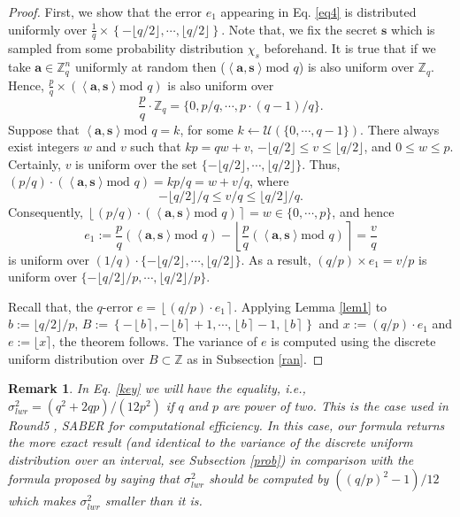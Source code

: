 \documentclass{cta-author}
\newtheorem{remark}{Remark}{}
\begin{document}
\begin{proof}
	First, we show that the error $e_1$ appearing in Eq. \eqref{eq4} is distributed uniformly over $\frac{1}{q} \times \left\{-\lfloor q/2 \rfloor, \cdots, \lfloor q/2 \rfloor \right\}$. 
	Note that, we fix the secret $\mathbf{s}$ which is sampled from some probability distribution $\chi_s$ beforehand. It is true that if we take $\mathbf{a} \in \mathbb{Z}_q^{n}$ uniformly at random then ($\left \langle\mathbf{a}, \mathbf{s} \right\rangle \text{mod }q$) is also uniform over $\mathbb{Z}_q$. Hence, $\frac{p}{q} \times (\left \langle\mathbf{a}, \mathbf{s} \right\rangle \text{mod }q)$ is also uniform over $$\frac{p}{q} \cdot \mathbb{Z}_q=\{0,p/q,\cdots, p \cdot (q-1)/q\}.$$ 
	Suppose that $\left \langle\mathbf{a}, \mathbf{s} \right\rangle \text{mod }q=k$, for some $k\leftarrow \mathcal{U}(\{0,\cdots,q-1\})$. There always exist integers $w$ and $v$ such that  $kp=qw+v$, $-\lfloor q/2 \rfloor \leq v \leq \lfloor q/2 \rfloor$, and $ 0 \leq w \leq p$. Certainly, $v$ is uniform over the set $\{-\lfloor q/2 \rfloor ,\cdots,\lfloor q/2 \rfloor \}$. Thus, $(p/q)\cdot (\left \langle\mathbf{a}, \mathbf{s} \right\rangle \text{mod }q)=kp/q=w+v/q$, where $$-\lfloor q/2 \rfloor/q \leq v/q \leq  \lfloor q/2 \rfloor/q.$$
	Consequently, $\left \lfloor (p/q) \cdot (\left \langle\mathbf{a}, \mathbf{s} \right\rangle \text{mod }q) \right\rceil =w \in \{0,\cdots,p\}$, and hence $$e_1:=\frac{p}{q}(\left \langle\mathbf{a}, \mathbf{s} \right\rangle \text{mod }q)-\left \lfloor \frac{p}{q}(\left \langle\mathbf{a}, \mathbf{s} \right\rangle \text{mod }q) \right\rceil =\frac{v}{q}$$ is uniform over $(1/q) \cdot \{-\lfloor q/2 \rfloor ,\cdots,\lfloor q/2 \rfloor \}$. As a result, $(q/p) \times e_1=v/p$ is uniform over $\{-{\lfloor q/2 \rfloor}/p, \cdots, {\lfloor q/2 \rfloor}/p\}.$ 
	
	Recall that, the $q$-error $e=\left \lfloor (q/p) \cdot e_1 \right \rceil.$ Applying Lemma \ref{lem1} to $b:={\lfloor q/2 \rfloor}/{p}$, $B:=\left\{-\left\lfloor b \right \rceil,  -\left\lfloor b \right \rceil+1, \cdots, \left\lfloor b \right \rceil -1, \left\lfloor b \right \rceil \right \}$ and $x:=(q/p) \cdot e_1$ and $e:=\lfloor x \rceil$, the theorem follows. The variance of $e$ is computed using the discrete uniform distribution over $B \subset \mathbb{Z}$ as in Subsection \ref{ran}. 
\end{proof}


\begin{remark}\label{rem1}
	In Eq. \eqref{key} we will have the equality, i.e., $ \sigma_{lwr}^2 =(q^2+2qp)/(12p^2)$ if $q$ and $p$ are power of two. This is the case used in Round5 \cite{BBGM+19}, SABER \cite{DKRV19} for computational efficiency. In this case, our formula returns the more exact result (and identical to the variance of the discrete uniform distribution over an interval, see Subsection \ref{prob}) in comparison with the formula proposed by \cite{Ngu18} saying that $ \sigma_{lwr}^2$ should be computed by $((q/p)^2-1)/12$ which makes $ \sigma_{lwr}^2$ smaller than it is. 
\end{remark}
\end{document}
